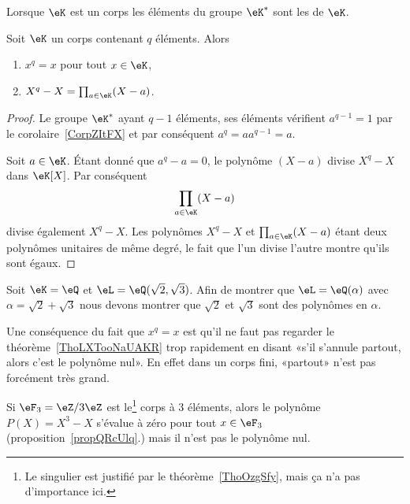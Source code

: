 Lorsque \( \eK\) est un corps les éléments du groupe \( \eK^*\) sont les  de \( \eK\).
\begin{proposition}     \label{propQRcUlq}
    Soit \( \eK\) un corps contenant \( q\) éléments. Alors
    \begin{enumerate}
        \item
            \( x^q=x\) pour tout \( x\in \eK\),
        \item
            \( X^q-X=\prod_{a\in \eK}(X-a)\).
    \end{enumerate}
\end{proposition}

\begin{proof}
    Le groupe \( \eK^*\) ayant \( q-1\) éléments, ses éléments vérifient \( a^{q-1}=1\) par le corolaire~\ref{CorpZItFX} et par conséquent \( a^q=aa^{q-1}=a \).

    Soit \( a\in \eK\). Étant donné que \( a^q-a=0\), le polynôme \( (X-a)\) divise \( X^q-X\) dans \( \eK[X]\). Par conséquent
    \begin{equation}
        \prod_{a\in \eK}(X-a)
    \end{equation}
    divise également \( X^q-X\). Les polynômes \( X^q-X\) et \( \prod_{a\in \eK}(X-a)\) étant deux polynômes unitaires de même degré, le fait que l'un divise l'autre montre qu'ils sont égaux.
\end{proof}

\begin{example}
    Soit \( \eK=\eQ\) et \( \eL=\eQ(\sqrt{2},\sqrt{3})\). Afin de montrer que \( \eL=\eQ(\alpha)\) avec \( \alpha=\sqrt{2}+\sqrt{3}\) nous devons montrer que \( \sqrt{2}\) et \( \sqrt{3}\) sont des polynômes en \( \alpha\).
\end{example}

Une conséquence du fait que \( x^q=x\) est qu'il ne faut pas regarder le théorème~\ref{ThoLXTooNaUAKR} trop rapidement en disant «s'il s'annule partout, alors c'est le polynôme nul». En effet dans un corps fini, «partout» n'est pas forcément très grand.

\begin{example}\label{exVQBooBMPLkD}
    Si \( \eF_3=\eZ/3\eZ\) est le\footnote{Le singulier est justifié par le théorème~\ref{ThoOzgSfy}, mais ça n'a pas d'importance ici.} corps à \( 3\)
    éléments, alors le polynôme \( P(X)=X^3-X\) s'évalue à zéro pour tout \( x\in \eF_3\) (proposition~\ref{propQRcUlq}.) mais il n'est pas le polynôme nul.
\end{example}

